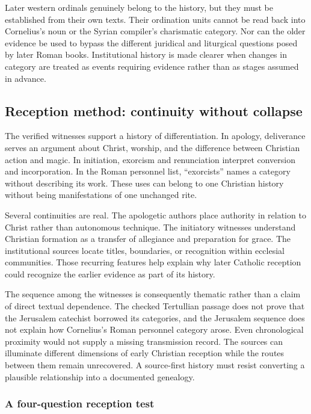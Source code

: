 Later western ordinals genuinely belong to the history, but they must be
established from their own texts. Their ordination units cannot be read back
into Cornelius's noun or the Syrian compiler's charismatic category. Nor can
the older evidence be used to bypass the different juridical and liturgical
questions posed by later Roman books. Institutional history is made clearer
when changes in category are treated as events requiring evidence rather than
as stages assumed in advance.

\subsection{Reception method: continuity without collapse}

The verified witnesses support a history of differentiation. In apology,
deliverance serves an argument about Christ, worship, and the difference
between Christian action and magic. In initiation, exorcism and renunciation
interpret conversion and incorporation. In the Roman personnel list,
``exorcists'' names a category without describing its work. These uses can
belong to one Christian history without being manifestations of one unchanged
rite.

Several continuities are real. The apologetic authors place authority in
relation to Christ rather than autonomous technique. The initiatory witnesses
understand Christian formation as a transfer of allegiance and preparation
for grace. The institutional sources locate titles, boundaries, or
recognition within ecclesial communities. Those recurring features help
explain why later Catholic reception could recognize the earlier evidence as
part of its history.

The sequence among the witnesses is consequently thematic rather than a claim
of direct textual dependence. The checked Tertullian passage does not prove
that the Jerusalem catechist borrowed its categories, and the Jerusalem
sequence does not explain how Cornelius's Roman personnel category arose.
Even chronological proximity would not supply a missing transmission record.
The sources can illuminate different dimensions of early Christian reception
while the routes between them remain unrecovered. A source-first history must
resist converting a plausible relationship into a documented genealogy.

\subsubsection{A four-question reception test}

